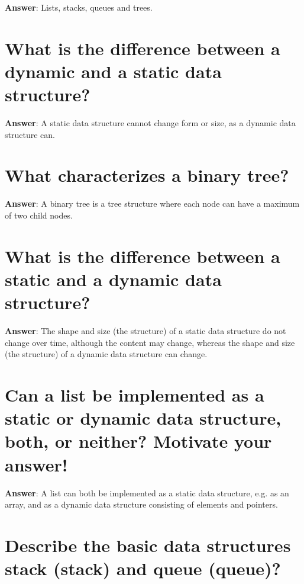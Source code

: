\documentclass[a4paper,11pt,oneside]{book}
\begin{document}
\begin{sloppypar}
\label{q:253:sa:en:True}

\textbf{Answer}: Lists, stacks, queues and trees.



\section{What is the difference between a dynamic and a static data structure?}

\label{q:254:sa:en:True}

\textbf{Answer}: A static data structure cannot change form or size, as a dynamic data structure can.



\section{What characterizes a binary tree?}

\label{q:255:sa:en:True}

\textbf{Answer}: A binary tree is a tree structure where each node can have a maximum of two child nodes.



\section{What is the difference between a static and a dynamic data structure?}

\label{q:256:sa:en:True}

\textbf{Answer}: The shape and size (the structure) of a static data structure do not change over time, although the content may change, whereas the shape and size (the structure) of a dynamic data structure can change.



\section{Can a list be implemented as a static or dynamic data structure, both, or neither? Motivate your answer!}

\label{q:257:sa:en:True}

\textbf{Answer}: A list can both be implemented as a static data structure, e.g. as an array, and as a dynamic data structure consisting of elements and pointers.



\section{Describe the basic data structures stack (stack) and queue (queue)?}


\end{sloppypar}
\end{document}
